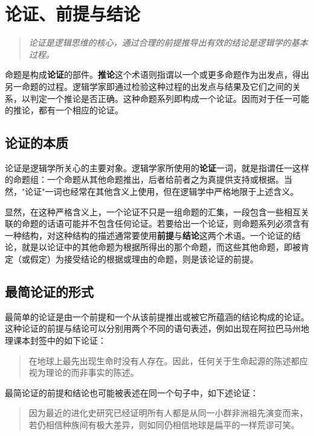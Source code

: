 \section{论证、前提与结论}

\begin{quotation}
\textit{论证是逻辑思维的核心，通过合理的前提推导出有效的结论是逻辑学的基本过程。}
\end{quotation}

命题是构成\textbf{论证}的部件。\textbf{推论}这个术语则指谓以一个或更多命题作为出发点，得出另一命题的过程。逻辑学家即通过检验这种过程的出发点与结果及它们之间的关系，以判定一个推论是否正确。这种命题系列即构成一个论证。因而对于任一可能的推论，都有一个相应的论证。

\subsection{论证的本质}

论证是逻辑学所关心的主要对象。逻辑学家所使用的\textbf{论证}一词，就是指谓任一这样的命题组：一个命题从其他命题推出，后者给前者之为真提供支持或根据。当然，"论证"一词也经常在其他含义上使用，但在逻辑学中严格地限于上述含义。

显然，在这种严格含义上，一个论证不只是一组命题的汇集，一段包含一些相互关联的命题的话语可能并不包含任何论证。若要给出一个论证，则命题系列必须含有一种结构，对这种结构的描述通常要使用\textbf{前提}与\textbf{结论}这两个术语。一个论证的结论，就是以论证中的其他命题为根据所得出的那个命题，而这些其他命题，即被肯定（或假定）为接受结论的根据或理由的命题，则是该论证的前提。

\subsection{最简论证的形式}

最简单的论证是由一个前提和一个从该前提推出或被它所蕴涵的结论构成的论证。这种论证的前提与结论可以分别用两个不同的语句表述，例如出现在阿拉巴马州地理课本封签中的如下论证：

\begin{quotation}
在地球上最先出现生命时没有人存在。因此，任何关于生命起源的陈述都应视为理论的而非事实的陈述。
\end{quotation}

最简论证的前提和结论也可能被表述在同一个句子中，如下述论证：

\begin{quotation}
因为最近的进化史研究已经证明所有人都是从同一小群非洲祖先演变而来，若仍相信种族间有极大差异，则如同仍相信地球是扁平的一样荒谬可笑。\cite{hayden2000}
\end{quotation}

